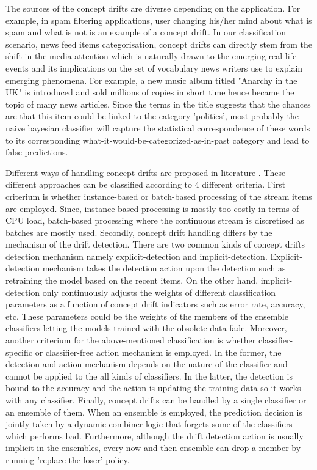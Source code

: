 \documentclass[12pt]{article}
\begin{document}
The sources of the concept drifts are diverse depending on the application. For example, in spam filtering applications, user changing his/her mind about what is spam and what is not is an example of a concept drift. In our classification scenario, news feed items categorisation, concept drifts can directly stem from the shift in the media attention which is naturally drawn to the emerging real-life events and its implications on the set of vocabulary news writers use to explain emerging phenomena. For example, a new music album titled  "Anarchy in the UK"  is introduced and sold millions of copies in short time hence became the topic of many news articles. Since the terms in the title suggests that the chances are that this item could be linked to the category 'politics', most probably the naive bayesian classifier will capture the statistical correspondence of these words to its corresponding what-it-would-be-categorized-as-in-past category and lead to false predictions.

Different ways of handling concept drifts are proposed in literature \citep[p. 5]{KunchevaEnsembleOverview08}. These different approaches can be classified according to 4 different criteria. First criterium is whether instance-based or batch-based processing of the stream items are employed. Since, instance-based processing is mostly too costly in terms of CPU load, batch-based processing where the continuous stream is discretised as batches are mostly used. Secondly, concept drift handling differs by the mechanism of the drift detection. There are two common kinds of concept drifts detection mechanism namely explicit-detection and implicit-detection. Explicit-detection mechanism takes the detection action upon the detection such as retraining the model based on the recent items. On the other hand, implicit-detection only continuously adjusts the weights of different classification parameters as a function of concept drift indicators such as error rate, accuracy, etc. These parameters could be the weights of the members of the ensemble classifiers letting the models trained with the obsolete data fade. Moreover, another criterium for the above-mentioned classification is whether classifier-specific or classifier-free action mechanism is employed. In the former, the detection and action mechanism depends on the nature of the classifier and cannot be applied to the all kinds of classifiers. In the latter, the detection is bound to the accuracy and the action is updating the training data so it works with any classifier. Finally, concept drifts can be handled by a single classifier or an ensemble of them. When an ensemble is employed, the prediction decision is jointly taken by a dynamic combiner logic that forgets some of the classifiers which performs bad. Furthermore, although the drift detection action is usually implicit in the ensembles, every now and then ensemble can drop a member by running 'replace the loser' policy.
\end{document}
